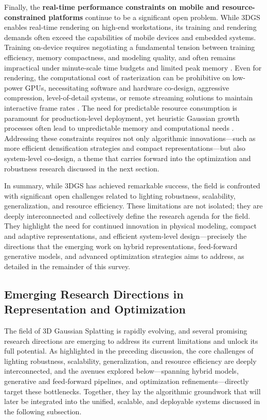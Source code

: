 \documentclass[11pt]{article}
\begin{document}
Finally, the \textbf{real-time performance constraints on mobile and resource-constrained platforms} continue to be a significant open problem. While 3DGS enables real-time rendering on high-end workstations, its training and rendering demands often exceed the capabilities of mobile devices and embedded systems. Training on-device requires negotiating a fundamental tension between training efficiency, memory compactness, and modeling quality, and often remains impractical under minute-scale time budgets and limited peak memory \cite{ref115}. Even for rendering, the computational cost of rasterization can be prohibitive on low-power GPUs, necessitating software and hardware co-design, aggressive compression, level-of-detail systems, or remote streaming solutions to maintain interactive frame rates \cite{ref114,ref415,ref483}. The need for predictable resource consumption is paramount for production-level deployment, yet heuristic Gaussian growth processes often lead to unpredictable memory and computational needs \cite{ref764}. Addressing these constraints requires not only algorithmic innovations---such as more efficient densification strategies and compact representations---but also system-level co-design, a theme that carries forward into the optimization and robustness research discussed in the next section.

In summary, while 3DGS has achieved remarkable success, the field is confronted with significant open challenges related to lighting robustness, scalability, generalization, and resource efficiency. These limitations are not isolated; they are deeply interconnected and collectively define the research agenda for the field. They highlight the need for continued innovation in physical modeling, compact and adaptive representations, and efficient system-level design---precisely the directions that the emerging work on hybrid representations, feed-forward generative models, and advanced optimization strategies aims to address, as detailed in the remainder of this survey.

\subsection{Emerging Research Directions in Representation and Optimization}

The field of 3D Gaussian Splatting is rapidly evolving, and several promising research directions are emerging to address its current limitations and unlock its full potential. As highlighted in the preceding discussion, the core challenges of lighting robustness, scalability, generalization, and resource efficiency are deeply interconnected, and the avenues explored below---spanning hybrid models, generative and feed-forward pipelines, and optimization refinements---directly target these bottlenecks. Together, they lay the algorithmic groundwork that will later be integrated into the unified, scalable, and deployable systems discussed in the following subsection.
\end{document}
